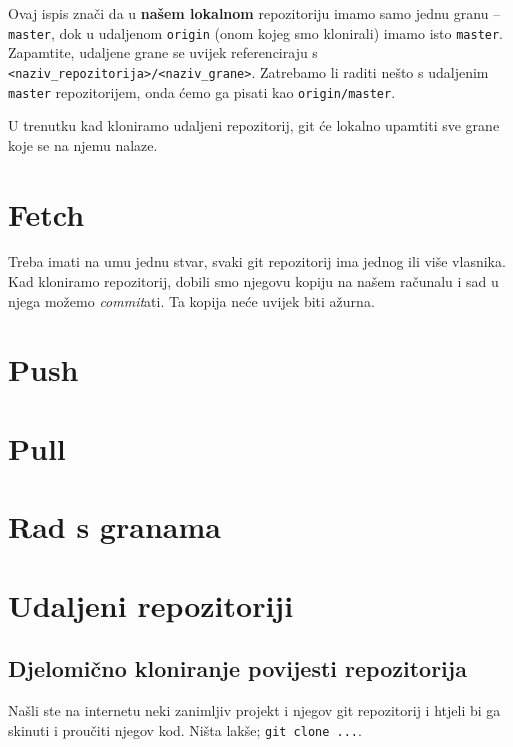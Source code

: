 Ovaj ispis znači da u \textbf{našem lokalnom} repozitoriju imamo samo jednu granu -- \verb+master+, dok u udaljenom \verb+origin+ (onom kojeg smo klonirali) imamo isto \verb+master+.
Zapamtite, udaljene grane se uvijek referenciraju s \verb+<naziv_repozitorija>/<naziv_grane>+. 
Zatrebamo li raditi nešto s udaljenim \verb+master+ repozitorijem, onda ćemo ga pisati kao \verb+origin/master+.

U trenutku kad kloniramo udaljeni repozitorij, git će lokalno upamtiti sve grane koje se na njemu nalaze.

%

\section*{Fetch}

Treba imati na umu jednu stvar, svaki git repozitorij ima jednog ili više vlasnika.
Kad kloniramo repozitorij, dobili smo njegovu kopiju na našem računalu i sad u njega možemo \emph{commit}ati.
Ta kopija neće uvijek biti ažurna.

\section*{Push}

\section*{Pull}

\section*{Rad s granama}

\section*{Udaljeni repozitoriji}

\subsection*{Djelomično kloniranje povijesti repozitorija}

Našli ste na internetu neki zanimljiv projekt i njegov git repozitorij i htjeli bi ga skinuti i proučiti njegov kod. 
Ništa lakše; \verb+git clone ...+.

